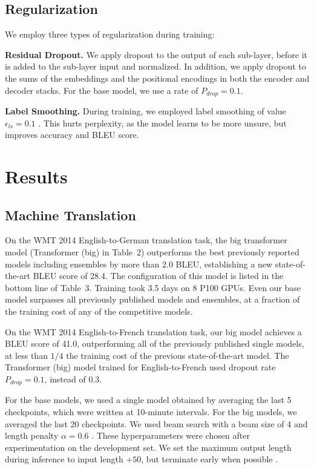 \subsection{Regularization}

We employ three types of regularization during training:

\textbf{Residual Dropout.} We apply dropout \cite{srivastava2014dropout} to the
output of each sub-layer, before it is added to the sub-layer input and
normalized. In addition, we apply dropout to the sums of the embeddings and the
positional encodings in both the encoder and decoder stacks. For the base model,
we use a rate of $P_{drop} = 0.1$.

\textbf{Label Smoothing.} During training, we employed label smoothing of value
$\epsilon_{ls} = 0.1$ \cite{szegedy2015rethinking}. This hurts perplexity, as
the model learns to be more unsure, but improves accuracy and BLEU score.

\section{Results}

\subsection{Machine Translation}

On the WMT 2014 English-to-German translation task, the big transformer model
(Transformer (big) in Table~2) outperforms the best previously reported models
including ensembles by more than 2.0 BLEU, establishing a new
state-of-the-art BLEU score of 28.4. The configuration of this model is listed
in the bottom line of Table~3. Training took 3.5 days on 8 P100 GPUs. Even our
base model surpasses all previously published models and ensembles, at a
fraction of the training cost of any of the competitive models.

On the WMT 2014 English-to-French translation task, our big model achieves a
BLEU score of 41.0, outperforming all of the previously published single models,
at less than $1/4$ the training cost of the previous state-of-the-art model.
The Transformer (big) model trained for English-to-French used dropout rate
$P_{drop} = 0.1$, instead of 0.3.

For the base models, we used a single model obtained by averaging the last 5
checkpoints, which were written at 10-minute intervals. For the big models, we
averaged the last 20 checkpoints. We used beam search with a beam size of 4 and
length penalty $\alpha = 0.6$ \cite{wu2016google}. These hyperparameters were
chosen after experimentation on the development set. We set the maximum output
length during inference to input length $+ 50$, but terminate early when
possible \cite{wu2016google}.

